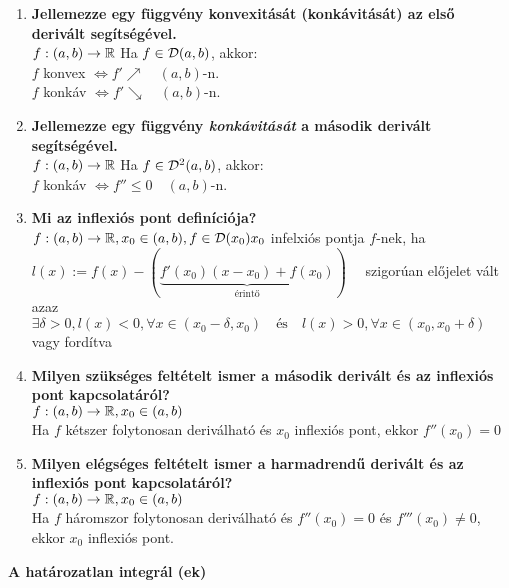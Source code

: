 \documentclass[a4paper,11pt]{article}
\begin{document}
\begin{enumerate}
	\item \textbf{Jellemezze egy függvény konvexitását (konkávitását) az első derivált segítségével.}\\[0.1cm]$f:(a,b)\to\mathbb{R}$ Ha $f\in\mathcal{D}(a,b)$, akkor:\\[0.1cm] $f$ konvex $\Leftrightarrow f'\nearrow\quad(a,b)$-n.\\[0.1cm]$f$ konkáv $\Leftrightarrow f'\searrow\quad(a,b)$-n.
	\item \textbf{Jellemezze egy függvény \textit{konkávitását} a második derivált segítségével.}\\[0.1cm]$f:(a,b)\to\mathbb{R}$ Ha $f\in\mathcal{D}^2(a,b)$, akkor:\\[0.1cm] $f$ konkáv $\Leftrightarrow f''\leq0\quad(a,b)$-n.
	\item\textbf{Mi az inflexiós pont definíciója?}\\[0.1cm]
	$f:(a,b)\to\mathbb{R},x_0\in(a,b),f\in\mathcal{D}(x_0)\\[0.2cm]x_0$ infelxiós pontja $f$-nek, ha
	$l(x):=f(x)-(\underbrace{f'(x_0)(x-x_0)+f(x_0)}_{\text{érintő}})\quad$
	szigorúan előjelet vált\\[0.2cm]azaz $\exists\delta>0,l(x)<0,\forall x\in
	(x_0-\delta,x_0)\quad\text{és}\quad l(x)>0,\forall x\in(x_0,x_0+\delta)\quad$
	vagy fordítva
	\item\textbf{Milyen szükséges feltételt ismer a második derivált és az
	inflexiós pont kapcsolatáról?}\\[0.1cm]
	$f:(a,b)\to\mathbb{R},x_0\in(a,b)$\\[0.1cm]Ha $f$ kétszer folytonosan
	deriválható és $x_0$ inflexiós pont, ekkor $f''(x_0)=0$
	\item\textbf{Milyen elégséges feltételt ismer a harmadrendű derivált és az
	inflexiós pont kapcsolatáról?}\\[0.1cm]$f:(a,b)\to\mathbb{R},x_0\in(a,b)$
	\\[0.1cm]Ha $f$ háromszor folytonosan deriválható és $f''(x_0)=0$ és $f'''(x_0)\neq0$, ekkor	$x_0$ inflexiós pont.
\end{enumerate}
\textbf{{\large A határozatlan integrál (\prfv ek)}}
\end{document}

